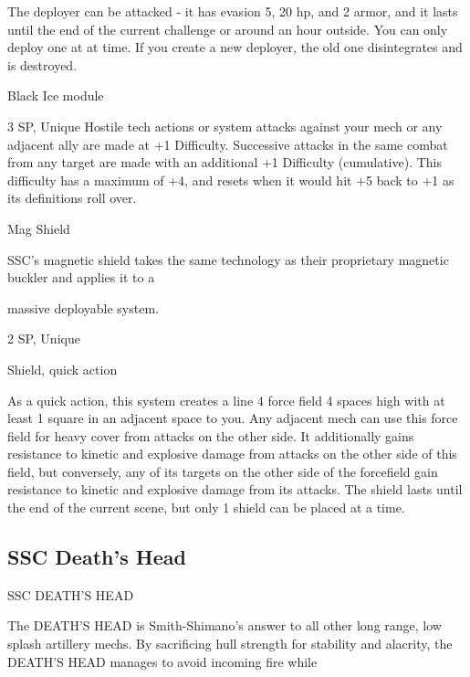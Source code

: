 The deployer can be attacked - it has evasion 5, 20 hp, and 2 armor, and it lasts until the end of  
the current challenge or around an hour outside. You can only deploy one at at time. If you create  
a new deployer, the old one disintegrates and is destroyed.
 

Black Ice module
 

                                                                                                                    


3 SP, Unique  
Hostile tech actions or system attacks against your mech or any adjacent ally are made at +1  
Difficulty. Successive attacks in the same combat from any target are made with an additional +1  
Difficulty (cumulative). This difficulty has a maximum of +4, and resets when it would hit +5 back  
to +1 as its definitions roll over.
 

Mag Shield  

SSC’s magnetic shield takes the same technology as their proprietary magnetic buckler and applies it to a  

massive deployable system.  

2 SP, Unique  

Shield, quick action
 
As a quick action, this system creates a line 4 force field 4 spaces high with at least 1 square in  
an adjacent space to you. Any adjacent mech can use this force field for heavy cover from  
attacks on the other side. It additionally gains resistance to kinetic and explosive damage from  
attacks on the other side of this field, but conversely, any of its targets on the other side of the  
forcefield gain resistance to kinetic and explosive damage from its attacks. The shield lasts until  
the end of the current scene, but only 1 shield can be placed at a time.
 

                                                                                                                      
\subsection{SSC Death's Head}

                                         SSC DEATH’S HEAD  

The DEATH’S HEAD is Smith-Shimano’s answer to all other long range, low splash artillery mechs. By  
sacrificing hull strength for stability and alacrity, the DEATH’S HEAD manages to avoid incoming fire while  

